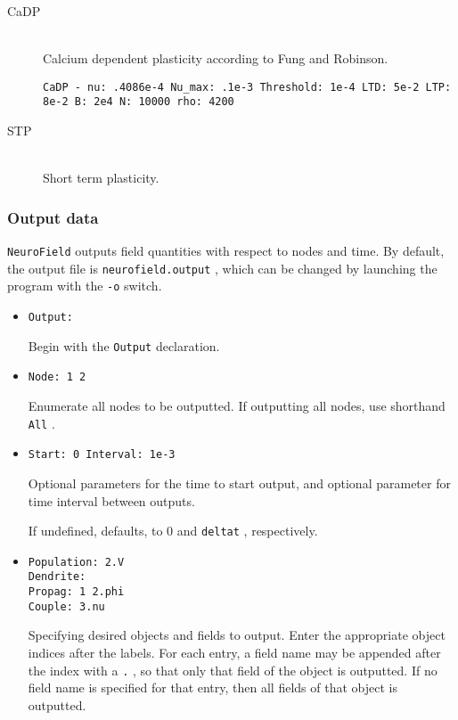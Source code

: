 \documentclass[12pt,a4paper]{article}
\newcommand{\type}[1]{ {\small\small\tt #1} }
\newcommand{\NF}[0]{ \type{NeuroField}}
\begin{document}
\begin{itemize}
\begin{description}
	\item[CaDP]\ \\
	Calcium dependent plasticity according to Fung and Robinson.
	\begin{lstlisting}
CaDP - nu: .4086e-4 Nu_max: .1e-3 Threshold: 1e-4 LTD: 5e-2 LTP: 8e-2 B: 2e4 N: 10000 rho: 4200
	\end{lstlisting}

	\item[STP]\ \\
	Short term plasticity.

\end{description}
\end{itemize}

\subsubsection{Output data}
\label{sec:output}

\NF outputs field quantities with respect to nodes and time. By default, the output file is \type{neurofield.output}, which can be changed by launching the program with the \type{-o} switch.

\begin{itemize}
	\item \begin{lstlisting}
Output:
		\end{lstlisting}
Begin with the \type{Output} declaration.
\item \begin{lstlisting}
Node: 1 2
\end{lstlisting}
Enumerate all nodes to be outputted. If outputting all nodes, use shorthand \type{All}.
\item \begin{lstlisting}
Start: 0 Interval: 1e-3
\end{lstlisting}
Optional parameters for the time to start output, and optional parameter for time interval between outputs.

If undefined, defaults, to 0 and \type{deltat}, respectively.
\item \begin{lstlisting}
Population: 2.V
Dendrite:
Propag: 1 2.phi
Couple: 3.nu
\end{lstlisting}
Specifying desired objects and fields to output. Enter the appropriate object indices after the labels. For each entry, a field name may be appended after the index with a \type{.}, so that only that field of the object is outputted. If no field name is specified for that entry, then all fields of that object is outputted.
\end{itemize}
\end{document}
